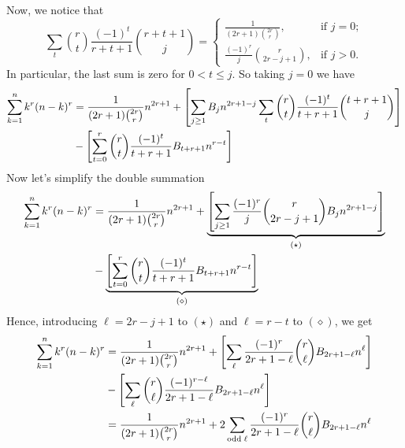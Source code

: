 Now, we notice that
\begin{equation}
    \sum_{t} \binom{r}{t} \frac{(-1)^t}{r+t+1} \binom{r+t+1}{j}
    =\begin{cases}
         \frac{1}{(2r+1) \binom{2r}r}, & \text{if } j=0;\\
         \frac{(-1)^r}{j} \binom{r}{2r-j+1}, & \text{if } j>0.
    \end{cases}\label{eq:combinatorial-identity}
\end{equation}
In particular, the last sum is zero for $0< t \leq j$.
So taking $j=0$ we have
\begin{equation}
    \begin{split}
        \sum_{k=1}^{n} k^{r} (n-k)^{r}
        &= \frac{1}{(2r+1) \binom{2r}r} n^{2r+1} + \left[ \sum_{j \geq 1} {B}\sb{j} n^{2r+1-j} \sum_{t} \binom{r}{t} \frac{(-1)^t}{t+r+1} \binom{t+r+1}{j} \right] \\
        &- \left[ \sum_{t=0}^{r} \binom{r}{t} \frac{(-1)^t}{t+r+1} {B}\sb{t+r+1} n^{r-t} \right]
    \end{split}\label{eq:equation5}
\end{equation}
Now let's simplify the double summation
\begin{equation}
    \begin{split}
        \sum_{k=1}^{n} k^{r} (n-k)^{r}
        &= \frac{1}{(2r+1) \binom{2r}r} n^{2r+1}
        + \underbrace{\left[ \sum_{j \geq 1} \frac{(-1)^r}{j} \binom{r}{2r-j+1} {B}\sb{j} n^{2r+1-j} \right]}_{(\star)} \\
        &- \underbrace{\left[ \sum_{t=0}^{r} \binom{r}{t} \frac{(-1)^t}{t+r+1} {B}\sb{t+r+1} n^{r-t} \right]}_{(\diamond)}
    \end{split}\label{eq:equation6}
\end{equation}
Hence, introducing $\ell=2r-j+1$ to $(\star)$ and $\ell=r-t$ to $(\diamond)$, we get
\begin{equation}
    \begin{split}
        \sum_{k=1}^{n} k^{r} (n-k)^{r}
        &= \frac{1}{(2r+1) \binom{2r}r} n^{2r+1}
        + \left[ \sum_{\ell} \frac{(-1)^r}{2r+1-\ell} \binom{r}{\ell} {B}\sb{2r+1-\ell} n^{\ell} \right] \\
        &- \left[ \sum_{\ell} \binom{r}{\ell} \frac{(-1)^{r-\ell}}{2r+1-\ell} {B}\sb{2r+1-\ell} n^{\ell} \right]\\
        &= \frac{1}{(2r+1) \binom{2r}r} n^{2r+1} + 2 \sum_{\mathrm{odd \; \ell}} \frac{(-1)^r}{2r+1-\ell} \binom{r}{\ell} {B}\sb{2r+1-\ell} n^{\ell}
    \end{split}\label{eq:polynomial-sum-1}
\end{equation}
